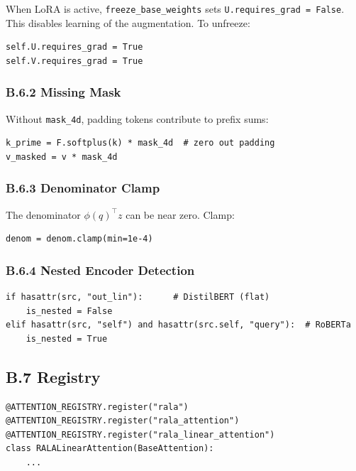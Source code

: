 When LoRA is active, \texttt{freeze\_base\_weights} sets \texttt{U.requires\_grad = False}. 
This disables learning of the augmentation. To unfreeze:

\begin{lstlisting}
self.U.requires_grad = True
self.V.requires_grad = True
\end{lstlisting}

\subsubsection{B.6.2 Missing Mask}

Without \texttt{mask\_4d}, padding tokens contribute to prefix sums:

\begin{lstlisting}
k_prime = F.softplus(k) * mask_4d  # zero out padding
v_masked = v * mask_4d
\end{lstlisting}

\subsubsection{B.6.3 Denominator Clamp}

The denominator $\phi(q)^\top z$ can be near zero. Clamp:

\begin{lstlisting}
denom = denom.clamp(min=1e-4)
\end{lstlisting}

\subsubsection{B.6.4 Nested Encoder Detection}

\begin{lstlisting}
if hasattr(src, "out_lin"):      # DistilBERT (flat)
    is_nested = False
elif hasattr(src, "self") and hasattr(src.self, "query"):  # RoBERTa
    is_nested = True
\end{lstlisting}

\subsection{B.7 Registry}

\begin{lstlisting}
@ATTENTION_REGISTRY.register("rala")
@ATTENTION_REGISTRY.register("rala_attention")
@ATTENTION_REGISTRY.register("rala_linear_attention")
class RALALinearAttention(BaseAttention):
    ...
\end{lstlisting}

